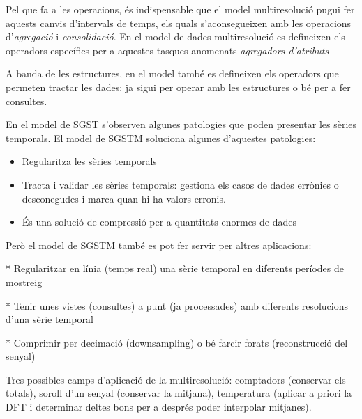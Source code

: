 Pel que fa a les operacions, és indispensable que el model multiresolució pugui fer aquests canvis d'intervals de temps, els quals s'aconsegueixen amb les operacions d'\emph{agregació} i \emph{consolidació}. En el model de dades multiresolució es defineixen els operadors específics per a aquestes tasques anomenats \emph{agregadors d'atributs}


A banda de les estructures, en el model també es defineixen els
operadors que permeten tractar les dades; ja sigui per operar amb les
estructures o bé per a fer consultes.









En el model de SGST s'observen algunes patologies que poden presentar les sèries temporals. El model de SGSTM soluciona algunes d'aquestes patologies:

\begin{itemize}
\item Regularitza les sèries temporals
\item Tracta i validar les sèries temporals: gestiona els casos de dades errònies o desconegudes i marca quan hi ha valors erronis.
\item És una solució de compressió per a quantitats enormes de dades
\end{itemize}


Però el model de SGSTM també es pot fer servir per altres aplicacions:

* Regularitzar en línia (temps real) una sèrie temporal en diferents períodes de mostreig

* Tenir unes vistes (consultes) a punt (ja processades) amb diferents resolucions d'una sèrie temporal

* Comprimir per decimació (downsampling) o bé farcir forats (reconstrucció del senyal)


Tres possibles camps d'aplicació de la multiresolució: comptadors (conservar els totals), soroll d'un senyal (conservar la mitjana), temperatura (aplicar a priori la DFT i determinar deltes bons per a després poder interpolar mitjanes).





